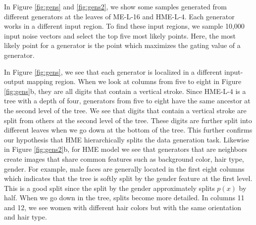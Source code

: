\documentclass[a4paper,onesided,12pt]{report}
\begin{document}
In Figure \ref{fig:gens} and \ref{fig:gens2}, we show some samples generated from different generators at the leaves of ME-L-16 and HME-L-4. Each generator works in a different input region. To find these input regions, we sample 10,000 input noise vectors and select the top five most likely points. Here, the most likely point for a generator is the point which maximizes the gating value of a generator.

In Figure \ref{fig:gens}, we see that each generator is localized in a different input-output mapping region. When we look at columns from five to eight in Figure \ref{fig:gens}b, they are all digits that contain a vertical stroke. Since HME-L-4 is a tree with a depth of four, generators from five to eight have the same ancestor at the second level of the tree. We see that digits that contain a vertical stroke are split from others at the second level of the tree. These digits are further split into different leaves when we go down at the bottom of the tree. This further confirms our hypothesis that HME hierarchically splits the data generation task. Likewise in Figure \ref{fig:gens2}b, for HME model we see that generators that are neighbors create images that share common features such as background color, hair type, gender. For example, male faces are generally located in the first eight columns which indicates that the tree is softly split by the gender feature at the first level. This is a good split since the split by the gender approximately splits $p(x)$ by half. When we go down in the tree, splits become more detailed. In columns 11 and 12, we see women with different hair colors but with the same orientation and hair type.
\end{document}
